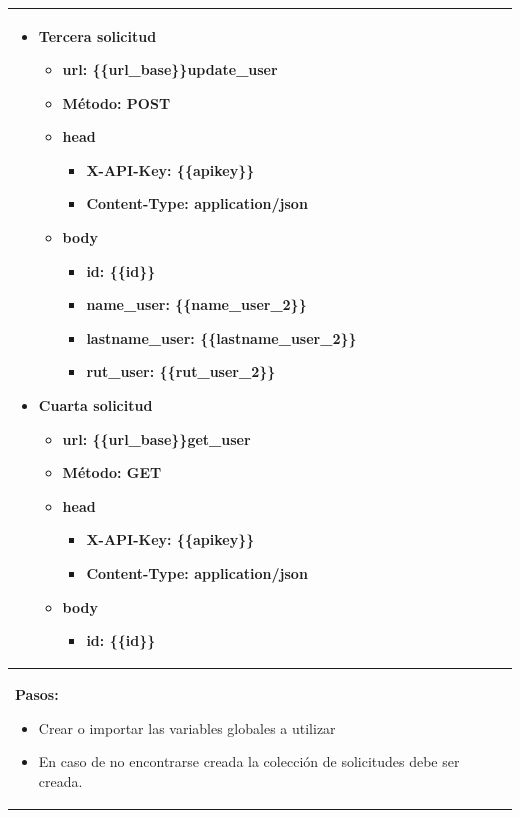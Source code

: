 \begin{table}[H]
    \begin{tabular}{|p{}|}
    	\hline
		\begin{itemize}
			\item Tercera solicitud
			\begin{itemize}
				\item url: \{\{url\_base\}\}update\_user
				\item Método: POST
				\item head
				\begin{itemize}
					\item X-API-Key: \{\{apikey\}\}
					\item Content-Type: application/json
				\end{itemize}
				\item body
				\begin{itemize}
					\item id: \{\{id\}\}
					\item name\_user: \{\{name\_user\_2\}\}
					\item lastname\_user: \{\{lastname\_user\_2\}\}
					\item rut\_user: \{\{rut\_user\_2\}\}
				\end{itemize}
			\end{itemize}
			\item Cuarta solicitud
			\begin{itemize}
				\item url: \{\{url\_base\}\}get\_user
				\item Método: GET
				\item head
				\begin{itemize}
					\item X-API-Key: \{\{apikey\}\}
					\item Content-Type: application/json
				\end{itemize}
				\item body
				\begin{itemize}
					\item id: \{\{id\}\}
				\end{itemize}
			\end{itemize}
		\end{itemize} \\ \hline
		\textbf{Pasos:}
		\begin{itemize}
			\item Crear o importar las variables globales a utilizar
			\item En caso de no encontrarse creada la colección de solicitudes debe ser creada.

\end{itemize}
\end{tabular}
\end{table}
